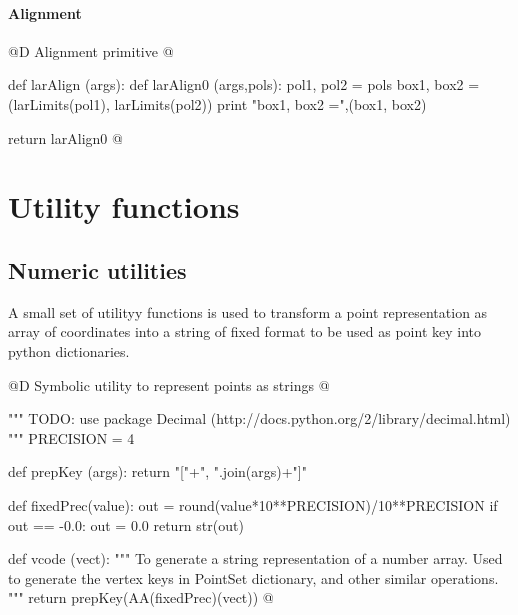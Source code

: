 \documentclass[11pt,oneside]{article}	%
\begin{document}
\paragraph{Alignment}
@D Alignment primitive
@{def larAlign (args):
	def larAlign0 (args,pols):
		pol1, pol2 = pols
		box1, box2 = (larLimits(pol1), larLimits(pol2))
		print "box1, box2 =",(box1, box2)
		
	return larAlign0
@}

\appendix
\section{Utility functions}



\subsection{Numeric utilities}

A small set of utilityy functions is used to transform a point representation as array of coordinates into a string of fixed format to be used as point key into python dictionaries.

@D Symbolic utility to represent points as strings
@{""" TODO: use package Decimal (http://docs.python.org/2/library/decimal.html) """
PRECISION = 4 

def prepKey (args): return "["+", ".join(args)+"]"

def fixedPrec(value):
	out = round(value*10**PRECISION)/10**PRECISION
	if out == -0.0: out = 0.0
	return str(out)
	
def vcode (vect): 
	"""
	To generate a string representation of a number array.
	Used to generate the vertex keys in PointSet dictionary, and other similar operations.
	"""
	return prepKey(AA(fixedPrec)(vect))
@}




\end{document}
